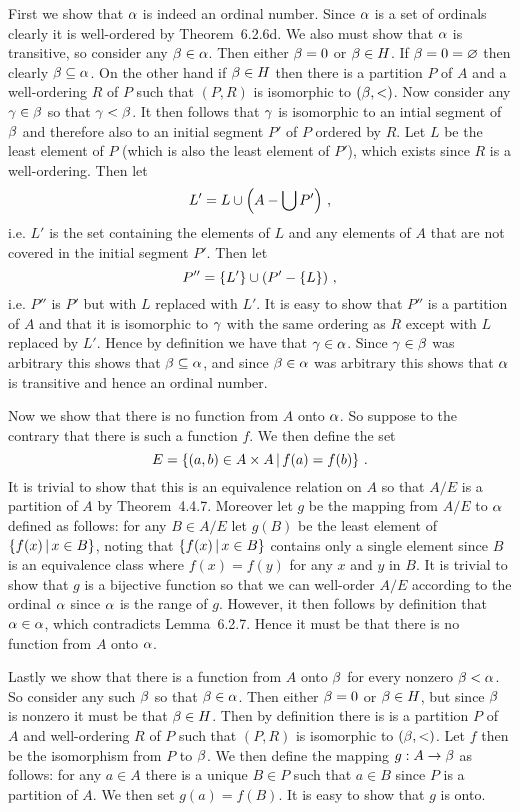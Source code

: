 \begin{solution}
    First we show that $\alpha$ is indeed an ordinal number.
    Since $\alpha$ is a set of ordinals clearly it is well-ordered by Theorem~6.2.6d.
    We also must show that $\alpha$ is transitive, so consider any $\beta \in \alpha$.
    Then either $\beta = 0$ or $\beta \in H$.
    If $\beta = 0 = \varnothing$ then clearly $\beta \subseteq \alpha$.
    On the other hand if $\beta \in H$ then there is a partition $P$ of $A$ and a well-ordering $R$ of $P$ such that $(P, R)$ is isomorphic to $(\beta, <)$.
    Now consider any $\gamma \in \beta$ so that $\gamma < \beta$.
    It then follows that $\gamma$ is isomorphic to an intial segment of $\beta$ and therefore also to an initial segment $P'$ of $P$ ordered by $R$.
    Let $L$ be the least element of $P$ (which is also the least element of $P'$), which exists since $R$ is a well-ordering.
    Then let
    $$
    L' = L \cup \left( A - \bigcup P' \right) \,,
    $$
    i.e. $L'$ is the set containing the elements of $L$ and any elements of $A$ that are not covered in the initial segment $P'$.
    Then let
    $$
    P'' = \left\{ L' \right\} \cup \left( P' - \left\{ L \right\} \right) \,,
    $$
    i.e. $P''$ is $P'$ but with $L$ replaced with $L'$.
    It is easy to show that $P''$ is a partition of $A$ and that it is isomorphic to $\gamma$ with the same ordering as $R$ except with $L$ replaced by $L'$.
    Hence by definition we have that $\gamma \in \alpha$.
    Since $\gamma \in \beta$ was arbitrary this shows that $\beta \subseteq \alpha$, and since $\beta \in \alpha$ was arbitrary this shows that $\alpha$ is transitive and hence an ordinal number.

    Now we show that there is no function from $A$ onto $\alpha$.
    So suppose to the contrary that there is such a function $f$.
    We then define the set
    $$
    E = \left\{ (a,b) \in A \times A \,|\, f(a) = f(b) \right\} \,.
    $$
    It is trivial to show that this is an equivalence relation on $A$ so that $A/E$ is a partition of $A$ by Theorem~4.4.7.
    Moreover let $g$ be the mapping from $A/E$ to $\alpha$ defined as follows: for any $B \in A/E$ let $g(B)$ be the least element of $\left\{ f(x) \,|\, x \in B \right\}$, noting that $\left\{ f(x) \,|\, x \in B \right\}$ contains only a single element since $B$ is an equivalence class where $f(x) = f(y)$ for any $x$ and $y$ in $B$.
    It is trivial to show that $g$ is a bijective function so that we can well-order $A/E$ according to the ordinal $\alpha$ since $\alpha$ is the range of $g$.
    However, it then follows by definition that $\alpha \in \alpha$, which contradicts Lemma~6.2.7.
    Hence it must be that there is no function from $A$ onto $\alpha$.

    Lastly we show that there is a function from $A$ onto $\beta$ for every nonzero $\beta < \alpha$.
    So consider any such $\beta$ so that $\beta \in \alpha$.
    Then either $\beta = 0$ or $\beta \in H$, but since $\beta$ is nonzero it must be that $\beta \in H$.
    Then by definition there is is a partition $P$ of $A$ and well-ordering $R$ of $P$ such that $(P,R)$ is isomorphic to $(\beta,<)$.
    Let $f$ then be the isomorphism from $P$ to $\beta$.
    We then define the mapping $g : A \to \beta$ as follows: for any $a \in A$ there is a unique $B \in P$ such that $a \in B$ since $P$ is a partition of $A$.
    We then set $g(a) = f(B)$.
    It is easy to show that $g$ is onto.


\end{solution}
